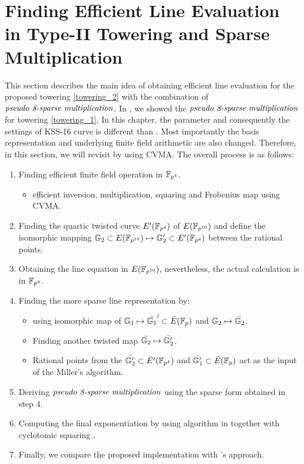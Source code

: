 \section{Finding Efficient Line Evaluation in Type-II Towering and Sparse Multiplication}
\label{sec:3}
This section describes the main idea of obtaining efficient line evaluation for the proposed towering \eqref{towering_2} with the combination of $\textit{pseudo 8-sparse multiplication}$.
In \cite{INDOCRYPT:KNGDNK17}, we showed the $\textit{pseudo 8-sparse multiplication}$ for towering \eqref{towering_1}. 
In this chapter, the parameter and consequently the settings of KSS-16 curve is different than \cite{INDOCRYPT:KNGDNK17}. 
Most importantly the basis representation and underlying finite field arithmetic are also changed. 
Therefore, in this section, we will revisit \cite{INDOCRYPT:KNGDNK17} by using CVMA.
The overall process is as follows:
\begin{enumerate}
	\item Finding efficient finite field operation in $\mathbb{F}_{p^4}$.
	\begin{itemize}
		\item efficient  inversion, multiplication, squaring and Frobenius map using CVMA.
	\end{itemize}
	\item Finding the quartic twisted curve $E'(\mathbb{F}_{p^4})$ of $E(\mathbb{F}_{p^{16}})$ and define the isomorphic mapping ${\mathbb{G}}_{2} \subset E(\mathbb{F}_{p^{16}}) \mapsto {\mathbb{G}}_{2}' \subset E'(\mathbb{F}_{p^4})$ between the rational points.
	\item Obtaining the line equation in $E(\mathbb{F}_{p^{16}})$, nevertheless, the actual calculation is in $\mathbb{F}_{p^4}$.
	\item Finding the more sparse line representation by:
		\begin{itemize}
		\item using isomorphic map of ${\mathbb{G}}_{1} \mapsto \bar{{\mathbb{G}}_{1}}' \subset \bar{E}(\mathbb{F}_p)$ and ${\mathbb{G}}_{2} \mapsto \bar{{\mathbb{G}}_{2}}$.
		\item Finding another twisted map $\bar{{\mathbb{G}}_{2}} \mapsto \bar{{\mathbb{G}}_{2}'}$. 
		\item Rational points from the $\bar{{\mathbb{G}}_{2}'} \subset \bar{E'}(\mathbb{F}_{p^4})$  and $\bar{{\mathbb{G}}_{1}'} \subset \bar{E}(\mathbb{F}_p)$ act as the input of the Miller's algorithm.
	\end{itemize}
	\item Deriving $\textit{pseudo 8-sparse multiplication}$ using the sparse form obtained in step 4.
	\item Computing the final exponentiation by using algorithm in \cite{EPRINT:GhaFou16b} together with cyclotomic squaring \cite{PKC:GraSco10}.
	\item  Finally, we compare the proposed implementation with \cite{INDOCRYPT:KNGDNK17}'s approach.
\end{enumerate}
